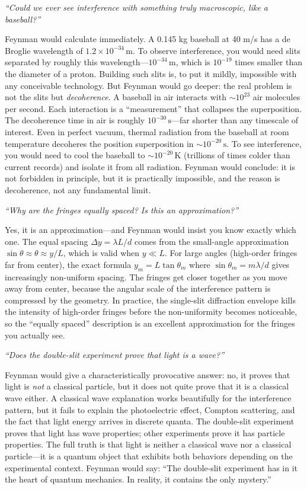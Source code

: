 \documentclass[11pt,openright]{book}
\begin{document}
\textit{``Could we ever see interference with something truly macroscopic, like a baseball?''}

Feynman would calculate immediately. A 0.145 kg baseball at 40 m/s has a de Broglie wavelength of $1.2\times 10^{-34}\,\text{m}$. To observe interference, you would need slits separated by roughly this wavelength---$10^{-34}\,\text{m}$, which is $10^{-19}$ times smaller than the diameter of a proton. Building such slits is, to put it mildly, impossible with any conceivable technology. But Feynman would go deeper: the real problem is not the slits but \emph{decoherence}. A baseball in air interacts with $\sim 10^{23}$ air molecules per second. Each interaction is a ``measurement'' that collapses the superposition. The decoherence time in air is roughly $10^{-30}\,\text{s}$---far shorter than any timescale of interest. Even in perfect vacuum, thermal radiation from the baseball at room temperature decoheres the position superposition in $\sim 10^{-20}\,\text{s}$. To see interference, you would need to cool the baseball to $\sim 10^{-20}\,\text{K}$ (trillions of times colder than current records) and isolate it from all radiation. Feynman would conclude: it is not forbidden in principle, but it is practically impossible, and the reason is decoherence, not any fundamental limit.

\textit{``Why are the fringes equally spaced? Is this an approximation?''}

Yes, it is an approximation---and Feynman would insist you know exactly which one. The equal spacing $\Delta y = \lambda L/d$ comes from the small-angle approximation $\sin\theta \approx \theta \approx y/L$, which is valid when $y \ll L$. For large angles (high-order fringes far from center), the exact formula $y_m = L\tan\theta_m$ where $\sin\theta_m = m\lambda/d$ gives increasingly non-uniform spacing. The fringes get closer together as you move away from center, because the angular scale of the interference pattern is compressed by the geometry. In practice, the single-slit diffraction envelope kills the intensity of high-order fringes before the non-uniformity becomes noticeable, so the ``equally spaced'' description is an excellent approximation for the fringes you actually see.

\textit{``Does the double-slit experiment prove that light is a wave?''}

Feynman would give a characteristically provocative answer: no, it proves that light is \emph{not} a classical particle, but it does not quite prove that it is a classical wave either. A classical wave explanation works beautifully for the interference pattern, but it fails to explain the photoelectric effect, Compton scattering, and the fact that light energy arrives in discrete quanta. The double-slit experiment proves that light has wave properties; other experiments prove it has particle properties. The full truth is that light is neither a classical wave nor a classical particle---it is a quantum object that exhibits both behaviors depending on the experimental context. Feynman would say: ``The double-slit experiment has in it the heart of quantum mechanics. In reality, it contains the only mystery.''
\end{document}
